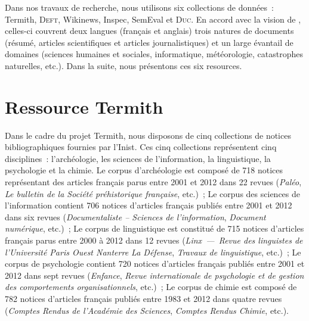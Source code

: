    Dans nos travaux de recherche, nous utilisons six collections de données~:
    Termith, \textsc{Deft}, Wikinews, Inspec, SemEval et \textsc{Duc}. En accord
    avec la vision de , celles-ci couvrent deux
    langues (français et anglais) trois natures de documents (résumé, articles
    scientifiques et articles journalistiques) et un large évantail de domaines
    (sciences humaines et sociales, informatique, météorologie, catastrophes
    naturelles, etc.). Dans la suite, nous présentons ces six resources.


  \section{Ressource Termith}
  \label{sec:main-data_description-termith_data}
    Dans le cadre du projet Termith, nous disposons de cinq collections de
    notices bibliographiques fournies par l'Inist. Ces cinq collections
    représentent cinq disciplines~: l'archéologie, les sciences de
    l'information, la linguistique, la psychologie et la chimie. Le corpus
    d'archéologie est composé de 718 notices représentant des articles français
    parus entre 2001 et 2012 dans 22 revues (\textit{Paléo}, \textit{Le bulletin
    de la Société préhistorique française}, etc.)~; Le corpus des sciences de
    l'information contient 706 notices d'articles français publiés entre 2001 et
    2012 dans six revues (\textit{Documentaliste -- Sciences de l'information},
    \textit{Document numérique}, etc.)~; Le corpus de linguistique est constitué
    de 715 notices d'articles français parus entre 2000 à 2012 dans 12 revues
    (\textit{Linx~---~Revue des linguistes de l'Université Paris Ouest Nanterre
    La Défense}, \textit{Travaux de linguistique}, etc.)~; Le corpus de
    psychologie contient 720 notices d'articles français publiés entre 2001 et
    2012 dans sept revues (\textit{Enfance}, \textit{Revue internationale de
    psychologie et de gestion des comportements organisationnels}, etc.)~; Le
    corpus de chimie est composé de 782 notices d'articles français publiés
    entre 1983 et 2012 dans quatre revues (\textit{Comptes Rendus de l'Académie
    des Sciences}, \textit{Comptes Rendus Chimie}, etc.).
    
